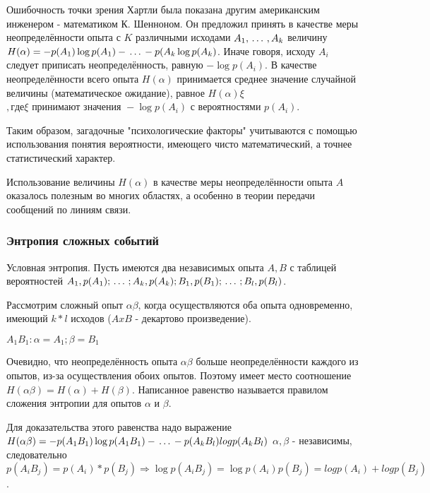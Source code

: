 \documentclass[a4paper,twoside,12pt]{report}
\begin{document}
	Ошибочность точки зрения Хартли была показана другим американским инженером - математиком К. Шенноном. Он предложил принять в качестве меры неопределённости опыта с $K$ различными исходами $A_1,\,\ldots\,,A_k$ величину $H(\alpha) = - p(A_1) \log p(A_1) - \,\ldots\, - p(A_k \log p(A_k)$. Иначе говоря, исходу $A_i$ следует приписать неопределённость, равную $- \log p(A_i)$. В качестве неопределённости всего опыта $H(\alpha)$ принимается среднее значение случайной величины (математическое ожидание), равное $H(\alpha) \xi $ $,где \xi \mbox{ принимают значения } - \log p(A_i) \mbox { с вероятностями } p(A_i)$.

	Таким образом, загадочные "психологические факторы" учитываются с помощью использования понятия вероятности, имеющего чисто математический, а точнее статистический характер.
	
	Использование величины $H(\alpha)$ в качестве меры неопределённости опыта $A$ оказалось полезным во многих областях, а особенно в теории передачи сообщений по линиям связи.

\subsubsection{Энтропия сложных событий ~~~}

	Условная энтропия. Пусть имеются два независимых опыта $A, B$ с таблицей вероятностей $A_1, p(A_1); \,\ldots\, ;A_k, p(A_k); B_1, p(B_1); \,\ldots\, ;B_l, p(B_l)$.
	
	Рассмотрим сложный опыт $\alpha \beta$, когда осуществляются оба опыта одновременно, имеющий $k*l$ исходов ($A x B$ - декартово произведение).

	$A_1B_1 : \alpha = A_1; \beta = B_1$

	Очевидно, что неопределённость опыта $\alpha \beta$ больше неопределённости каждого из опытов, из-за осуществления обоих опытов. Поэтому имеет место соотношение $H(\alpha\beta) = H(\alpha)+H(\beta)$. Написанное равенство называется правилом сложения энтропии для опытов $\alpha$ и $\beta$.

	Для доказательства этого равенства надо выражение $H(\alpha\beta) = - p(A_1B_1) \log p(A_1B_1) - \,\ldots\, - p(A_kB_l) log p(A_kB_l)$ $\alpha, \beta$ - независимы, следовательно $p(A_iB_j) = p(A_i) * p(B_j) \Rightarrow \log p(A_iB_j) = \log p(A_i) p(B_j) = log p(A_i) + log p(B_j)$.
\end{document}
